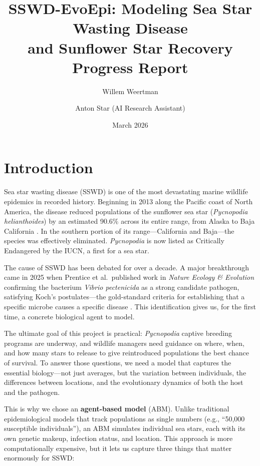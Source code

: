 \documentclass[11pt]{article}
\title{\textbf{SSWD-EvoEpi: Modeling Sea Star Wasting Disease\\and Sunflower Star Recovery}\\[0.5em]\Large Progress Report}
\author{Willem Weertman \and Anton Star (AI Research Assistant)}
\date{March 2026}
\begin{document}
\maketitle

\section{Introduction}

Sea star wasting disease (SSWD) is one of the most devastating marine wildlife epidemics in recorded history. Beginning in 2013 along the Pacific coast of North America, the disease reduced populations of the sunflower sea star (\textit{Pycnopodia helianthoides}) by an estimated 90.6\% across its entire range, from Alaska to Baja California \citep{gravem2021}. In the southern portion of its range---California and Baja---the species was effectively eliminated. \textit{Pycnopodia} is now listed as Critically Endangered by the IUCN, a first for a sea star.

The cause of SSWD has been debated for over a decade. A major breakthrough came in 2025 when Prentice et al.\ published work in \textit{Nature Ecology \& Evolution} confirming the bacterium \textit{Vibrio pectenicida} as a strong candidate pathogen, satisfying Koch's postulates---the gold-standard criteria for establishing that a specific microbe causes a specific disease \citep{prentice2025}. This identification gives us, for the first time, a concrete biological agent to model.

The ultimate goal of this project is practical: \textit{Pycnopodia} captive breeding programs are underway, and wildlife managers need guidance on where, when, and how many stars to release to give reintroduced populations the best chance of survival. To answer those questions, we need a model that captures the essential biology---not just averages, but the variation between individuals, the differences between locations, and the evolutionary dynamics of both the host and the pathogen.

This is why we chose an \textbf{agent-based model} (ABM). Unlike traditional epidemiological models that track populations as single numbers (e.g., ``50,000 susceptible individuals''), an ABM simulates individual sea stars, each with its own genetic makeup, infection status, and location. This approach is more computationally expensive, but it lets us capture three things that matter enormously for SSWD:
\end{document}
